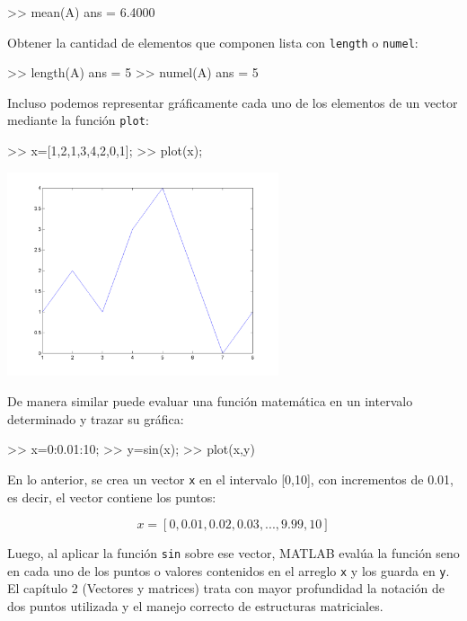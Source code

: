 \begin{matlab}
>> mean(A)
ans =
    6.4000
\end{matlab}

Obtener la cantidad de elementos que componen lista con \texttt{length}
o \texttt{numel}:

\begin{matlab}
>> length(A)
ans =
     5
>> numel(A)
ans =
     5
\end{matlab}

Incluso podemos representar gráficamente cada uno de los elementos de un
vector mediante la función \texttt{plot}:

\begin{matlab}
>> x=[1,2,1,3,4,2,0,1];
>> plot(x);
\end{matlab}

\begin{center}
\includegraphics[width=0.6\textwidth]{src/img/ch1/img_1_2.png}
\label{fig:graph_fun}
\end{center}

De manera similar puede evaluar una función matemática en un intervalo
determinado y trazar su gráfica:

\begin{matlab}
>> x=0:0.01:10;
>> y=sin(x);
>> plot(x,y)
\end{matlab}

En lo anterior, se crea un vector \texttt{x} en el intervalo {[}0,10{]},
con incrementos de 0.01, es decir, el vector contiene los puntos:

$$ x = [0, 0.01, 0.02, 0.03,..., 9.99, 10] $$

Luego, al aplicar la función \texttt{sin} sobre ese vector, MATLAB
evalúa la función seno en cada uno de los puntos o valores contenidos en
el arreglo \texttt{x} y los guarda en \texttt{y}. El capítulo 2
(Vectores y matrices) trata con mayor profundidad la notación de dos
puntos utilizada y el manejo correcto de estructuras matriciales.

